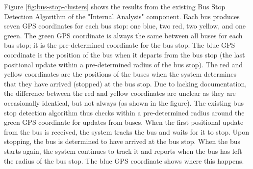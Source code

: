 Figure \ref{fig:bus-stop-clusters} shows the results from the existing Bus Stop Detection Algorithm of the "Internal Analysis" component.
Each bus produces seven GPS coordinates for each bus stop: one blue, two red, two yellow, and one green.
The green GPS coordinate is always the same between all buses for each bus stop; it is the pre-determined coordinate for the bus stop.
The blue GPS coordinate is the position of the bus when it departs from the bus stop (the last positional update within a pre-determined radius of the bus stop).
The red and yellow coordinates are the positions of the buses when the system determines that they have arrived (stopped) at the bus stop.
Due to lacking documentation, the difference between the red and yellow coordinates are unclear as they are occasionally identical, but not always (as shown in the figure).
The existing bus stop detection algorithm thus checks within a pre-determined radius around the green GPS coordinate for updates from buses.
When the first positional update from the bus is received, the system tracks the bus and waits for it to stop.
Upon stopping, the bus is determined to have arrived at the bus stop.
When the bus starts again, the system continues to track it and reports when the bus has left the radius of the bus stop.
The blue GPS coordinate shows where this happens. 